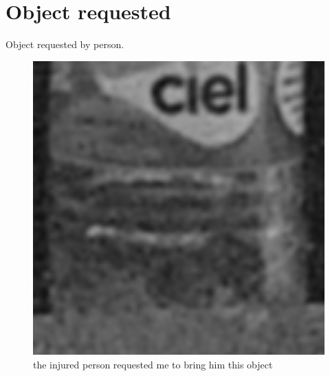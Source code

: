 \documentclass[11pt]{article}
\begin{document}
\section{Object requested}

Object requested by person.

\begin{figure}[h]
	\begin{center}
		\includegraphics[width=1\textwidth]{EmergencyObjectRequested.png}
		\caption{the injured person requested me to bring him this object}
	\end{center}
\end{figure}
\end{document}
